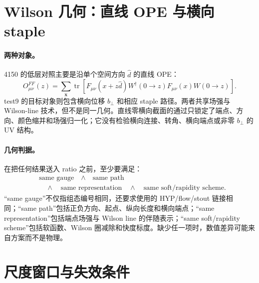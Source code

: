 \section{Wilson 几何：直线 OPE 与横向 staple}

\paragraph{两种对象。}
4150 的低层对照主要是沿单个空间方向 $\hat d$ 的直线 OPE：
\begin{equation}
  O^{FF}_{\mu\nu}(z)=
  \sum_{\boldsymbol x}\operatorname{tr}\left[
  F_{\mu\nu}(x+z\hat d)W^\dagger(0\to z)F_{\mu\nu}(x)W(0\to z)
  \right].
  \label{eq:b09-straight-ope}
\end{equation}
test9 的目标对象则包含横向位移 \(b_\perp\) 和相应 staple 路径。两者共享场强与 Wilson-line 技术，但不是同一几何。直线零横向截面的通过只锁定了端点、方向、颜色缩并和场强归一化；它没有检验横向连接、转角、横向端点或非零 \(b_\perp\) 的 UV 结构。

\paragraph{几何判据。}
在把任何结果送入 ratio 之前，至少要满足：
\begin{equation}
  \begin{aligned}
  &\text{same gauge}\quad\land\quad
  \text{same path}\\
  &\quad\land\quad
  \text{same representation}\quad\land\quad
  \text{same soft/rapidity scheme}.
  \end{aligned}
  \label{eq:b09-geometry-gate}
\end{equation}
“same gauge”不仅指组态编号相同，还要求使用的 HYP/flow/stout 链接相同；“same path”包括正负方向、起点、纵向长度和横向端点；“same representation”包括端点场强与 Wilson line 的伴随表示；“same soft/rapidity scheme”包括软函数、Wilson 圈减除和快度标度。缺少任一项时，数值差异可能来自方案而不是物理。

\section{尺度窗口与失效条件}

